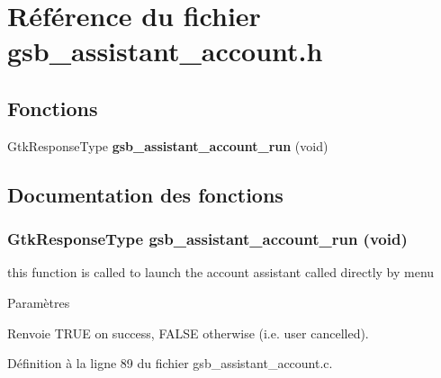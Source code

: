 \section{Référence du fichier gsb\_\-assistant\_\-account.h}
\label{gsb__assistant__account_8h}
\subsection*{Fonctions}
\begin{DoxyCompactItemize}
\item 
GtkResponseType {\bf gsb\_\-assistant\_\-account\_\-run} (void)
\end{DoxyCompactItemize}


\subsection{Documentation des fonctions}
\subsubsection[{gsb\_\-assistant\_\-account\_\-run}]{\setlength{\rightskip}{0pt plus 5cm}GtkResponseType gsb\_\-assistant\_\-account\_\-run (void)}\label{gsb__assistant__account_8h_a8813f2fd12b26961beca70c591b499e1}
this function is called to launch the account assistant called directly by menu


\begin{DoxyParams}{Paramètres}
\item[{\em }]\end{DoxyParams}
\begin{DoxyReturn}{Renvoie}
TRUE on success, FALSE otherwise (i.e. user cancelled). 
\end{DoxyReturn}


Définition à la ligne 89 du fichier gsb\_\-assistant\_\-account.c.

